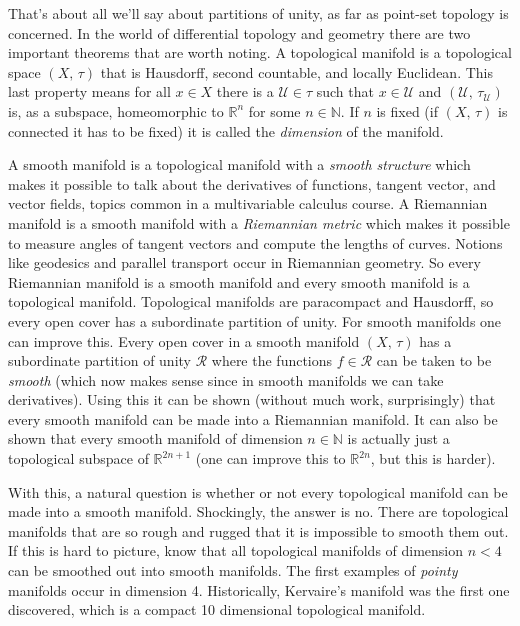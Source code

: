 \documentclass{article}
\theoremstyle{plain}
\theoremstyle{normal}
\begin{document}
        That's about all we'll say about partitions of unity, as far as
        point-set topology is concerned. In the world of differential topology
        and geometry there are two important theorems that are worth noting.
        A topological manifold is a topological space $(X,\,\tau)$ that is
        Hausdorff, second countable, and locally Euclidean. This last property
        means for all $x\in{X}$ there is a $\mathcal{U}\in\tau$ such that
        $x\in\mathcal{U}$ and $(\mathcal{U},\,\tau_{\mathcal{U}})$ is, as a
        subspace, homeomorphic to $\mathbb{R}^{n}$ for some $n\in\mathbb{N}$.
        If $n$ is fixed (if $(X,\,\tau)$ is connected it has to be fixed) it is
        called the \textit{dimension} of the manifold.
        \par\hfill\par
        A smooth manifold is a topological manifold with a
        \textit{smooth structure} which makes it possible to talk about the
        derivatives of functions, tangent vector, and vector fields, topics
        common in a multivariable calculus course. A Riemannian manifold is a
        smooth manifold with a \textit{Riemannian metric} which makes it
        possible to measure angles of tangent vectors and compute the lengths
        of curves. Notions like geodesics and parallel transport occur in
        Riemannian geometry. So every Riemannian manifold is a smooth manifold
        and every smooth manifold is a topological manifold. Topological
        manifolds are paracompact and Hausdorff, so every open cover has a
        subordinate partition of unity. For smooth manifolds one can improve
        this. Every open cover in a smooth manifold $(X,\,\tau)$ has a
        subordinate partition of unity $\mathcal{R}$ where the functions
        $f\in\mathcal{R}$ can be taken to be \textit{smooth}
        (which now makes sense since in smooth manifolds we can take
        derivatives). Using this it can be shown (without much work,
        surprisingly) that every smooth manifold can be made into a Riemannian
        manifold. It can also be shown that every smooth manifold of dimension
        $n\in\mathbb{N}$ is actually just a topological subspace of
        $\mathbb{R}^{2n+1}$ (one can improve this to $\mathbb{R}^{2n}$, but
        this is harder).
        \par\hfill\par
        With this, a natural question is whether or not every topological
        manifold can be made into a smooth manifold. Shockingly, the answer
        is no. There are topological manifolds that are so rough and rugged that
        it is impossible to smooth them out. If this is hard to picture, know
        that all topological manifolds of dimension $n<4$ can be smoothed out
        into smooth manifolds. The first examples of \textit{pointy} manifolds
        occur in dimension 4. Historically, Kervaire's manifold was the first
        one discovered, which is a compact 10 dimensional topological manifold.
\end{document}
